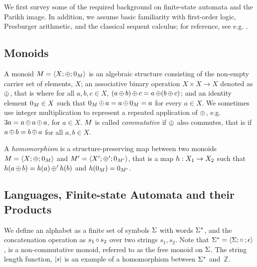 We first survey some of the required background on finite-state
automata and the Parikh image. In addition, we assume basic familiarity
with first-order logic, Presburger
arithmetic, and the classical sequent calculus; for reference, see
e.g. \cite{Fitting96a}.

\subsection{Monoids}



A monoid $M = \left\langle X;\operatorname{\oplus};0_{M}\right\rangle$ is an algebraic structure
consisting of the non-empty carrier set of elements, $X$; an associative binary operation
$X \times X \rightarrow X$ denoted as $\operatorname{\oplus}$, that is where for all $a, b,
c \in X$, $(a \operatorname{\oplus} b) \operatorname{\oplus} c = a \operatorname{\oplus} (b \operatorname{\oplus} c)$; 
and an identity element $0_{M} \in X$ such that
$0_{M} \operatorname{\oplus} a = a \operatorname{\oplus} 0_{M} =   a$ for every $a \in X$.
We sometimes use integer multiplication to represent a repeated application of
$\operatorname{\oplus}$, e.g. $3a = a \operatorname{\oplus} a \operatorname{\oplus} a$, for $a \in X$. $M$ is
called \textit{commutative} if $\operatorname{\oplus}$ also commutes, that is if $a
\operatorname{\oplus} b = b \operatorname{\oplus} a$ for all $a, b \in X$. 

A \textit{homomorphism} is a structure-preserving map between two
monoids $M = \left\langle X;\operatorname{\oplus};0_{M}\right\rangle$ and
$M' = \left\langle X';\operatorname{\oplus}';0_{M'}\right\rangle$, that is a map
$h : X_1 \rightarrow X_2$ such that
$h(a \operatorname{\oplus} b) = h(a) \operatorname{\oplus}' h(b)$ and
$h(0_{M}) = 0_{M'}$.

%
%

\subsection{Languages, Finite-state Automata and their Products}\label{sec:languages}

We define an alphabet as a finite set of symbols $\Sigma$ with words $\Sigma^*$, and
the concatenation operation as $s_1 \operatorname{\circ}{} s_2$ over two strings $s_1, s_2$.
Note that $\Sigma^* = \left\langle\Sigma;\operatorname{\circ}{};\epsilon\right\rangle$, is a
non-commutative monoid, referred to as the free monoid on $\Sigma$.
The string length
function, $|s|$ is an example of a homomorphism between $\Sigma^*$
and~$\mathbb{Z}$.


